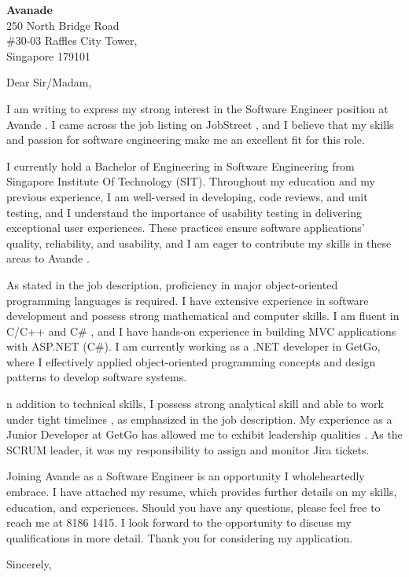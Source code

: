 \documentclass[a4paper, 11pt]{letter}
\newcommand{\companyname}{ Avande }
\newcommand{\joblistingon}{ JobStreet }
\newcommand{\programing}{ C/C++ and C\# }
\newcommand{\role}{ Software Engineer }
\newcommand{\softskill}{ possess strong analytical skill and able to work under tight timelines }
\begin{document}
\begin{letter}
{   %
\textbf{Avanade} \\
250 North Bridge Road \\
\#30-03 Raffles City Tower,\\
Singapore 179101 \\
}

\makecovertitle

\contact

\opening{Dear Sir/Madam,}

I am writing to express my strong interest in the \role position at  \companyname. I came across the job listing on \joblistingon, and I believe that my skills and passion for software engineering make me an excellent fit for this role. 

I currently hold a Bachelor of Engineering in Software Engineering from Singapore Institute Of Technology (SIT). Throughout my education and my previous experience, I am well-versed in developing, code reviews, and unit testing, and I understand the importance of usability testing in delivering exceptional user experiences. These practices ensure software applications' quality, reliability, and usability, and I am eager to contribute my skills in these areas to \companyname. 

As stated in the job description, proficiency in major object-oriented programming languages is required. I have extensive experience in software development and possess strong mathematical and computer skills. I am fluent in \programing, and I have hands-on experience in building MVC applications with ASP.NET (C\#). I am currently working as a .NET developer in GetGo, where I effectively applied object-oriented programming concepts and design patterns to develop software systems.

n addition to technical skills, I \softskill, as emphasized in the job description. My experience as a Junior Developer at GetGo has allowed me to exhibit leadership qualities . As the SCRUM leader, it was my responsibility to assign and monitor Jira tickets. 

Joining \companyname as a \role is an opportunity I wholeheartedly embrace. I have attached my resume, which provides further details on my skills, education, and experiences. Should you have any questions, please feel free to reach me at 8186 1415. I look forward to the opportunity to discuss my qualifications in more detail. Thank you for considering my application.


\closing{Sincerely,}
\end{letter}
\end{document}
